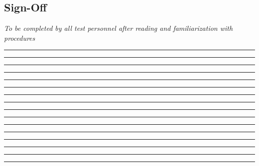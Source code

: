 \subsection{Sign-Off}
\textit{To be completed by all test personnel after reading and familiarization with procedures}
\begin{checklist}
    \item \opsfull      \tabto{25em}\rule{10em}{0.4pt}\hspace{5em}\rule{10em}{0.4pt}
    \item \primaryfull  \tabto{25em}\rule{10em}{0.4pt}\hspace{5em}\rule{10em}{0.4pt}
    \item \secondaryfull\tabto{25em}\rule{10em}{0.4pt}\hspace{5em}\rule{10em}{0.4pt}
    \item \daqfull      \tabto{25em}\rule{10em}{0.4pt}\hspace{5em}\rule{10em}{0.4pt}
    \item \controlfull      \tabto{25em}\rule{10em}{0.4pt}\hspace{5em}\rule{10em}{0.4pt}
    \item \perifull     \tabto{25em}\rule{10em}{0.4pt}\hspace{5em}\rule{10em}{0.4pt}
    \item \periifull    \tabto{25em}\rule{10em}{0.4pt}\hspace{5em}\rule{10em}{0.4pt}
    \item \periiifull    \tabto{25em}\rule{10em}{0.4pt}\hspace{5em}\rule{10em}{0.4pt}
\end{checklist}
\setcounter{checklistnum}{0}

\newpage
